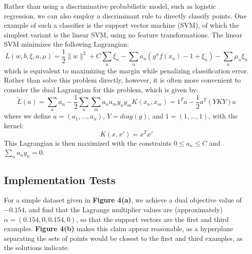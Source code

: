 \documentclass[10pt,psamsfonts]{amsart}
\theoremstyle{definition}
\theoremstyle{remark}
\numberwithin{equation}{section}
\begin{document}
Rather than using a discriminative probabilistic model, such as logistic regression, we can also employ a discriminant rule to directly classify points. One example of such a classifier is the support vector machine (SVM), of which the simplest variant is the linear SVM, using no feature transformations. The linear SVM minimizes the following Lagrangian:
$$L(w, b, \xi, a, \mu) = \frac{1}{2}\|w\|^2 + C\sum_n \xi_n - \sum_n a_n(y^n f(x_n) - 1+ \xi_n) - \sum_n \mu_n \xi_n$$
which is equivalent to maximizing the margin while penalizing classification error. Rather than solve this problem directly, however, it is often more convenient to consider the dual Lagrangian for this problem, which is given by:
$$\tilde{L}(a) = \sum_n a_n - \frac{1}{2} \sum_n \sum_m a_na_m y_ny_m K(x_n,x_m) = 1^T a - \frac{1}{2} a^T(YKY)a$$
where we define $a = (a_1, \dots, a_n)$, $Y = diag(y)$, and $1 = (1, \dots, 1)$, with the kernel:
$$K(x,x') = x^Tx'$$
This Lagrangian is then maximized with the constraints $0\leq a_n \leq C$ and $\sum_n a_ny_n = 0$.

\subsection{Implementation Tests} For a simple dataset given in {\bf Figure 4(a)}, we achieve a dual objective value of $-0.154$, and find that the Lagrange multiplier values are (approximately) $ \alpha = (0.154, 0, 0.154, 0)$, so that the support vectors are the first and third examples. {\bf Figure 4(b)} makes this claim appear reasonable, as a hyperplane separating the sets of points would be closest to the first and third examples, as the solutions indicate.
\end{document}
